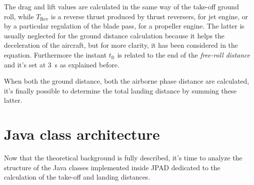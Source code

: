%
The drag and lift values are calculated in the same way of the take-off ground roll, while $T_{\text{Rev}}$ is a reverse thrust produced by thrust reversers, for jet engine, or by a particular regulation of the blade pass, for a propeller engine. The latter is usually neglected for the ground distance calculation because it helps the deceleration of the aircraft, but for more clarity, it has been considered in the equation. Furthermore the instant $t_{\text{fr}}$ is related to the end of the \emph{free-roll distance} and it's set at \SI{3}{\second} as explained before.

\bigskip
\noindent
When both the ground distance, both the airborne phase distance are calculated, it's finally possible to determine the total landing distance by summing these latter.
\section{Java class architecture}
%
Now that the theoretical background is fully described, it's time to analyze the structure of the Java classes implemented inside \gls{JPAD} dedicated to the calculation of the take-off and landing distances.
%
